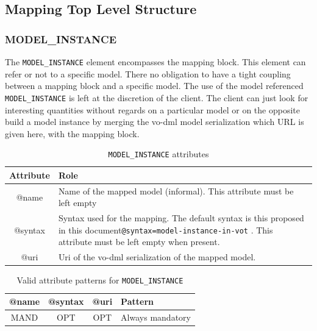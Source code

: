 \documentclass[11pt,a4paper]{ivoa}
\begin{document}
%
%

\subsection{Mapping Top Level Structure}
%
%

\subsubsection{MODEL\_INSTANCE}

The  \texttt{MODEL\_INSTANCE}  element encompasses the mapping block. 
This element can refer or not to a specific model. There no obligation to have a tight coupling between a mapping block and a specific model. The use of the model referenced  \texttt{MODEL\_INSTANCE}  is left at the discretion of the client. The client can just look for interesting quantities without regards on a particular model or on the opposite build a model instance by merging the vo-dml model serialization which URL is given here, with the mapping block.

\begin{table}[!htbp]
\small
\centering
\begin{tabulary}{\linewidth}{|c|J|}       
       \hline 
            \textbf{Attribute} & 
            \textbf {Role}\\
       \hline         \hline  
            @name  & 
            Name of the mapped model (informal).  This attribute must be left empty  \\
       \hline 
            @syntax  & 
            Syntax used for the mapping. The default syntax  is this proposed in this document\texttt{@syntax=model-instance-in-vot} . This attribute must be left empty when present.\\
       \hline 
            @uri  & 
            Uri of the vo-dml serialization of the mapped model. \\
       \hline 
     \end{tabulary}
     \caption{\texttt{MODEL\_INSTANCE} attributes} 
     \label{tbl:model-att}
 \end{table}

\begin{table}[!htbp]
\small
\centering
\begin{tabulary}{\linewidth}{|c|c|c|J|}
    \hline 
        \textbf{@name} &        
        \textbf{@syntax} &       
        \textbf{@uri} &
        \textbf{Pattern}\\
    \hline      \hline  
        MAND &           
        OPT &           
        OPT &   
        Always mandatory\\
   \hline 
\end{tabulary}
     \caption{Valid attribute patterns for  \texttt{MODEL\_INSTANCE}} 
     \label{tbl:model-pattern}
 \end{table}
\FloatBarrier
\end{document}
